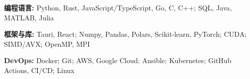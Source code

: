 \begin{enumerate}[label={[\arabic*]},nosep]
  \item \textbf{编程语言:} Python, Rust, JavaScript/TypeScript, Go, C, C++; SQL, Java, MATLAB, Julia
  \item \textbf{框架与库:} Tauri, React; Numpy, Pandas, Polars, Scikit-learn, PyTorch; CUDA; SIMD/AVX; OpenMP, MPI
  \item \textbf{DevOps:} Docker; Git; AWS, Google Cloud; Ansible; Kubernetes; GitHub Actions, CI/CD; Linux
\end{enumerate}
